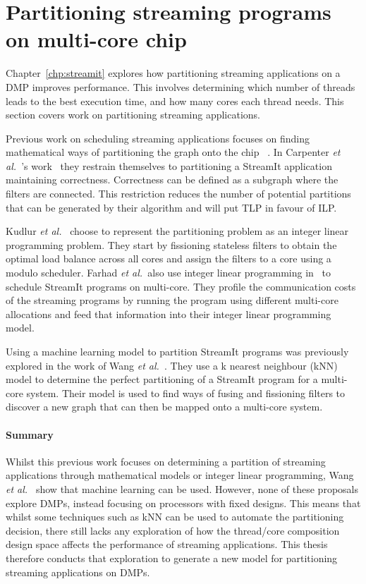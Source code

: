 \section{Partitioning streaming programs on multi-core chip}
Chapter~\ref{chp:streamit} explores how partitioning streaming applications on a DMP improves performance.
This involves determining which number of threads leads to the best execution time, and how many cores each thread needs.
This section covers work on partitioning streaming applications. 

Previous work on scheduling streaming applications focuses on finding mathematical ways of partitioning the graph onto the chip ~\cite{carpenter2009streammap,kudlur2008orchestratingstreamprog}.  
In Carpenter {\it et al.~}'s work~\cite{carpenter2009streammap} they restrain themselves to partitioning a StreamIt application maintaining correctness.
Correctness can be defined as a subgraph where the filters are connected. 
This restriction reduces the number of potential partitions that can be generated by their algorithm and will put TLP in favour of ILP. 

Kudlur {\it et al.~}\cite{kudlur2008orchestratingstreamprog} choose to represent the partitioning problem as an integer linear programming problem.
They start by fissioning stateless filters to obtain the optimal load balance across all cores and assign the filters to a core using a modulo scheduler.
Farhad {\it et al.~}also use integer linear programming in~\cite{farhad2012streamilp} to schedule StreamIt programs on multi-core.
They profile the communication costs of the streaming programs by running the program using different multi-core allocations and feed that information into their integer linear programming model.

Using a machine learning model to partition StreamIt programs was previously explored in the work of Wang {\it et al.~}\cite{wang2013partitionstreamit}.
They use a k nearest neighbour (kNN) model to determine the perfect partitioning of a StreamIt program for a multi-core system. 
Their model is used to find ways of fusing and fissioning filters to discover a new graph that can then be mapped onto a multi-core system.
\vspace{-1em}
\paragraph*{Summary}
Whilst this previous work focuses on determining a partition of streaming applications through mathematical models or integer linear programming, Wang {\it et al.~}\cite{wang2013partitionstreamit} show that machine learning can be used.
However, none of these proposals explore DMPs, instead focusing on processors with fixed designs.
This means that whilst some techniques such as kNN can be used to automate the partitioning decision, there still lacks any exploration of how the thread/core composition design space affects the performance of streaming applications.
This thesis therefore conducts that exploration to generate a new model for partitioning streaming applications on DMPs.
 


